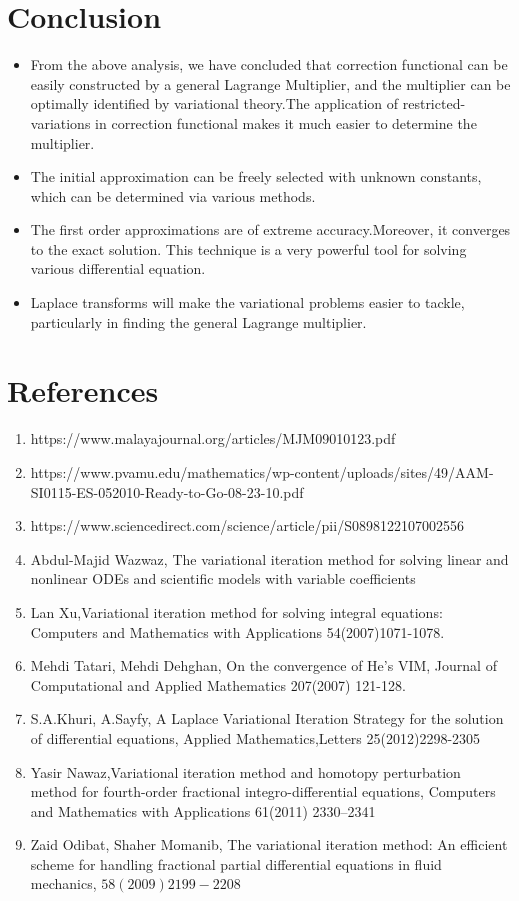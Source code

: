 \documentclass[12pt, a4paper]{report}
\begin{document}
\chapter*{Conclusion}
\begin{itemize}
    \item From the above analysis, we have concluded that correction functional can be easily constructed by a general Lagrange Multiplier, and the multiplier can be optimally identified by variational theory.The application of restricted-variations in correction functional makes it much easier to determine the multiplier.\\
    \item  The initial approximation can be freely selected with unknown constants, which can be determined via various methods.\\
    \item  The first order approximations are of extreme accuracy.Moreover, it converges to the exact solution. This technique is a very powerful tool for solving various differential equation.
    \item  Laplace transforms will make the variational problems easier to tackle, particularly in finding the general Lagrange multiplier.
\end{itemize}

\clearpage

\chapter*{References}
\begin{enumerate}
    \item https://www.malayajournal.org/articles/MJM09010123.pdf
    \item https://www.pvamu.edu/mathematics/wp-content/uploads/sites/49/AAM-SI0115-ES-052010-Ready-to-Go-08-23-10.pdf
    \item https://www.sciencedirect.com/science/article/pii/S0898122107002556
    \item Abdul-Majid Wazwaz, The variational iteration method for solving linear and nonlinear ODEs and scientific models with variable coefficients 
    \item Lan Xu,Variational iteration method for solving integral equations: Computers and Mathematics with Applications 54(2007)1071-1078.
    \item Mehdi Tatari, Mehdi Dehghan, On the convergence of He's VIM, Journal of Computational and Applied Mathematics 207(2007) 121-128.
    \item S.A.Khuri, A.Sayfy, A Laplace Variational Iteration Strategy for the solution of differential equations, Applied Mathematics,Letters 25(2012)2298-2305
    \item Yasir Nawaz,Variational iteration method and homotopy perturbation method for fourth-order fractional integro-differential equations, Computers and Mathematics with Applications 61(2011) 2330–2341
    \item Zaid Odibat, Shaher Momanib, The variational iteration method: An efficient scheme for handling fractional partial differential equations in fluid mechanics, $58(2009) 2199-2208$
\end{enumerate}
\clearpage
\end{document}
